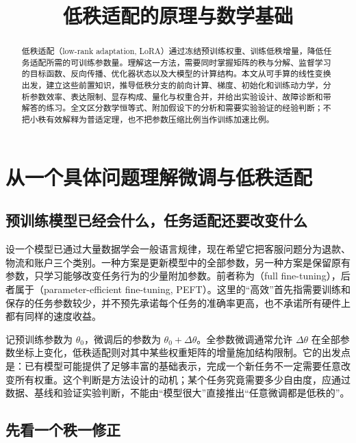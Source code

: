 \documentclass[UTF8,12pt,a4paper,fontset=fandol]{ctexart}
\title{低秩适配的原理与数学基础}
\author{}
\date{}
\begin{document}
\maketitle

\begin{abstract}
低秩适配（low-rank adaptation, LoRA）通过冻结预训练权重、训练低秩增量，降低任务适配所需的可训练参数量。理解这一方法，需要同时掌握矩阵的秩与分解、监督学习的目标函数、反向传播、优化器状态以及大模型的计算结构。本文从可手算的线性变换出发，建立这些前置知识，推导低秩分支的前向计算、梯度、初始化和训练动力学，分析参数效率、表达限制、显存构成、量化与权重合并，并给出实验设计、故障诊断和带解答的练习。全文区分数学恒等式、附加假设下的分析和需要实验验证的经验判断；不把小秩有效解释为普适定理，也不把参数压缩比例当作训练加速比例。
\end{abstract}

\tableofcontents

\section{从一个具体问题理解微调与低秩适配}
\label{sec:motivation}

\subsection{预训练模型已经会什么，任务适配还要改变什么}

设一个模型已通过大量数据学会一般语言规律，现在希望它把客服问题分为退款、物流和账户三个类别。一种方案是更新模型中的全部参数，另一种方案是保留原有参数，只学习能够改变任务行为的少量附加参数。前者称为（full fine-tuning），后者属于（parameter-efficient fine-tuning, PEFT）。这里的“高效”首先指需要训练和保存的任务参数较少，并不预先承诺每个任务的准确率更高，也不承诺所有硬件上都有同样的速度收益。

记预训练参数为 $\theta_0$，微调后的参数为 $\theta_0+\Delta\theta$。全参数微调通常允许 $\Delta\theta$ 在全部参数坐标上变化，低秩适配则对其中某些权重矩阵的增量施加结构限制。它的出发点是：已有模型可能提供了足够丰富的基础表示，完成一个新任务不一定需要任意改变所有权重。这个判断是方法设计的动机；某个任务究竟需要多少自由度，应通过数据、基线和验证实验判断，不能由“模型很大”直接推出“任意微调都是低秩的”。

\subsection{先看一个秩一修正}
\end{document}
